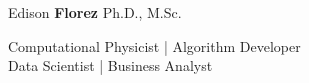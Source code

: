 \begin{center}
    {\fontsize{50}{40}\selectfont Edison \textbf{Florez}}
    \hspace*{5mm}
    {\fontsize{20}{40}\selectfont Ph.D., M.Sc.}

    \vspace*{3mm}
    \Large{
        Computational Physicist | Algorithm Developer \\
        Data Scientist | Business Analyst \\
    }
\end{center}
